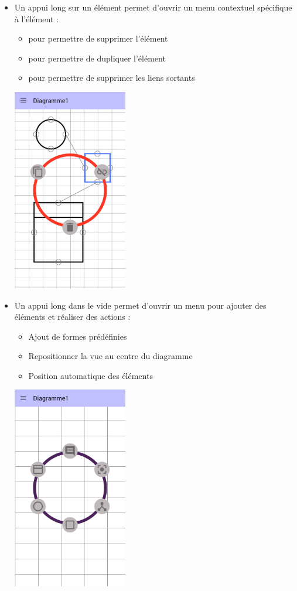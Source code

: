 \begin{itemize}
\begin{minipage}{\linewidth}
		\end{minipage}
\item Un appui long sur un élément permet d'ouvrir un menu contextuel spécifique à l'élément :
  \begin{itemize}
  	\item pour permettre de supprimer l'élément
  	\item pour permettre de dupliquer l'élément
  	\item pour permettre de supprimer les liens sortants
  \end{itemize}
  \begin{minipage}{\linewidth}
  	\centering
  	\includegraphics[width=5cm]{img/screen/new/colladia_draw_view_menu_contextuel_select}
  \end{minipage}		
\item Un appui long dans le vide permet d'ouvrir un menu pour ajouter des éléments et réaliser des actions :
		\begin{itemize}
			\item Ajout de formes prédéfinies
			\item Repositionner la vue au centre du diagramme
			\item Position automatique des éléments
		\end{itemize}
		\begin{minipage}{\linewidth}
			\centering
			\includegraphics[width=5cm]{img/screen/new/colladia_draw_view_menu_contextuel_main}

\end{minipage}
\end{itemize}
